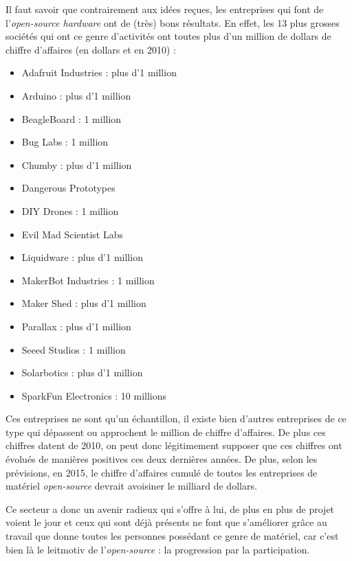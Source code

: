 Il faut savoir que contrairement aux idées reçues, les entreprises qui font de l'\textit{open-source hardware} ont de (très) bons résultats. En effet, les 13 plus grosses sociétés qui ont ce genre d'activités ont toutes plus d'un million de dollars de chiffre d'affaires (en dollars et en 2010) :
 \begin{itemize}
 \item Adafruit Industries : plus d'1 million
 \item Arduino : plus d'1 million
 \item BeagleBoard : 1 million
 \item Bug Labs : 1 million
 \item Chumby : plus d'1 million
 \item Dangerous Prototypes
 \item DIY Drones : 1 million
 \item Evil Mad Scientist  Labs
 \item Liquidware : plus d'1 million
 \item MakerBot Industries : 1 million
 \item Maker Shed : plus d'1 million
 \item Parallax : plus d'1 million
 \item Seeed Studios : 1 million
 \item Solarbotics : plus d'1 million
 \item SparkFun Electronics : 10 millions
 \end{itemize}  
Ces entreprises ne sont qu'un échantillon, il existe bien d'autres entreprises de ce type qui dépassent ou approchent le million de chiffre d'affaires. De plus ces chiffres datent de 2010, on peut donc légitimement supposer que ces chiffres ont évolués de manières positives ces deux dernières années. De plus, selon les prévisions, en 2015, le chiffre d'affaires cumulé de toutes les entreprises de matériel \textit{open-source} devrait avoisiner le milliard de dollars.

Ce secteur a donc un avenir radieux qui s'offre à lui, de plus en plus de projet voient le jour et ceux qui sont déjà présents ne font que s'améliorer grâce au travail que donne toutes les personnes possédant ce genre de matériel, car c'est bien là le leitmotiv de l'\textit{open-source} : la progression par la participation.
